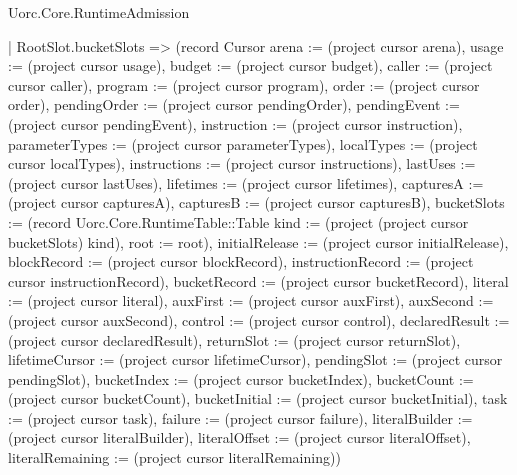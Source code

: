 \begin{lexlean}{Uorc.Core.RuntimeAdmission}
\begin{semanticmodule}
{    | RootSlot.bucketSlots => (record Cursor {arena := (project cursor arena), usage := (project cursor usage), budget := (project cursor budget), caller := (project cursor caller), program := (project cursor program), order := (project cursor order), pendingOrder := (project cursor pendingOrder), pendingEvent := (project cursor pendingEvent), instruction := (project cursor instruction), parameterTypes := (project cursor parameterTypes), localTypes := (project cursor localTypes), instructions := (project cursor instructions), lastUses := (project cursor lastUses), lifetimes := (project cursor lifetimes), capturesA := (project cursor capturesA), capturesB := (project cursor capturesB), bucketSlots := (record Uorc.Core.RuntimeTable::Table {kind := (project (project cursor bucketSlots) kind), root := root}), initialRelease := (project cursor initialRelease), blockRecord := (project cursor blockRecord), instructionRecord := (project cursor instructionRecord), bucketRecord := (project cursor bucketRecord), literal := (project cursor literal), auxFirst := (project cursor auxFirst), auxSecond := (project cursor auxSecond), control := (project cursor control), declaredResult := (project cursor declaredResult), returnSlot := (project cursor returnSlot), lifetimeCursor := (project cursor lifetimeCursor), pendingSlot := (project cursor pendingSlot), bucketIndex := (project cursor bucketIndex), bucketCount := (project cursor bucketCount), bucketInitial := (project cursor bucketInitial), task := (project cursor task), failure := (project cursor failure), literalBuilder := (project cursor literalBuilder), literalOffset := (project cursor literalOffset), literalRemaining := (project cursor literalRemaining)})
}
\end{semanticmodule}
\end{lexlean}
